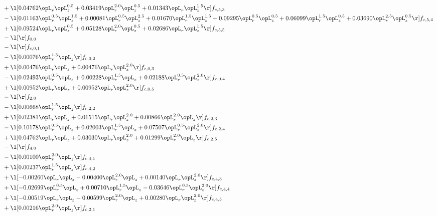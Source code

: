 \begin{alignat}{2}
& + \l[  0.04762 \opL_r \opL_z^{0.5} +  0.03419 \opL_r^{2.0} \opL_z^{0.5} +  0.01343 \opL_r \opL_z^{1.5}  \r] f_{c,5,3} \nonumber \\ 
& - \l[  0.01163 \opL_r^{0.5} \opL_z^{1.5} +  0.00081 \opL_r^{0.5} \opL_z^{2.5} +  0.01670 \opL_r^{1.5} \opL_z^{1.5} +  0.09295 \opL_r^{0.5} \opL_z^{0.5} +  0.06099 \opL_r^{1.5} \opL_z^{0.5} +  0.03690 \opL_r^{2.5} \opL_z^{0.5}  \r] f_{c,5,4} \nonumber \\ 
& + \l[  0.09524 \opL_r \opL_z^{0.5} +  0.05128 \opL_r^{2.0} \opL_z^{0.5} +  0.02686 \opL_r \opL_z^{1.5}  \r] f_{c,5,5} \nonumber \\ 
& - \l[  \r] f_{0,0} \nonumber \\ 
& - \l[  \r] f_{c,0,1} \nonumber \\ 
& - \l[  0.00076 \opL_r^{1.5} \opL_z  \r] f_{c,0,2} \nonumber \\ 
& + \l[  0.00476 \opL_r \opL_z +  0.00476 \opL_r \opL_z^{2.0}  \r] f_{c,0,3} \nonumber \\ 
& - \l[  0.02493 \opL_r^{0.5} \opL_z +  0.00228 \opL_r^{1.5} \opL_z +  0.02188 \opL_r^{0.5} \opL_z^{2.0}  \r] f_{c,0,4} \nonumber \\ 
& + \l[  0.00952 \opL_r \opL_z +  0.00952 \opL_r \opL_z^{2.0}  \r] f_{c,0,5} \nonumber \\ 
& - \l[  \r] f_{2,0} \nonumber \\ 
& - \l[  0.00668 \opL_r^{1.5} \opL_z  \r] f_{c,2,2} \nonumber \\ 
& + \l[  0.02381 \opL_r \opL_z +  0.01515 \opL_r \opL_z^{2.0} +  0.00866 \opL_r^{2.0} \opL_z  \r] f_{c,2,3} \nonumber \\ 
& - \l[  0.10178 \opL_r^{0.5} \opL_z +  0.02003 \opL_r^{1.5} \opL_z +  0.07507 \opL_r^{0.5} \opL_z^{2.0}  \r] f_{c,2,4} \nonumber \\ 
& + \l[  0.04762 \opL_r \opL_z +  0.03030 \opL_r \opL_z^{2.0} +  0.01299 \opL_r^{2.0} \opL_z  \r] f_{c,2,5} \nonumber \\ 
& - \l[  \r] f_{4,0} \nonumber \\ 
& - \l[  0.00100 \opL_r^{2.0} \opL_z  \r] f_{c,4,1} \nonumber \\ 
& + \l[  0.00237 \opL_r^{1.5} \opL_z  \r] f_{c,4,2} \nonumber \\ 
& + \l[  -0.00260 \opL_r \opL_z   -0.00400 \opL_r^{2.0} \opL_z +  0.00140 \opL_r \opL_z^{2.0}  \r] f_{c,4,3} \nonumber \\ 
& + \l[  -0.02699 \opL_r^{0.5} \opL_z +  0.00710 \opL_r^{1.5} \opL_z   -0.03646 \opL_r^{0.5} \opL_z^{2.0}  \r] f_{c,4,4} \nonumber \\ 
& + \l[  -0.00519 \opL_r \opL_z   -0.00599 \opL_r^{2.0} \opL_z +  0.00280 \opL_r \opL_z^{2.0}  \r] f_{c,4,5} \nonumber \\ 
& + \l[  0.00216 \opL_r^{2.0} \opL_z  \r] f_{c,2,1} \nonumber \\ 
\end{alignat} 


